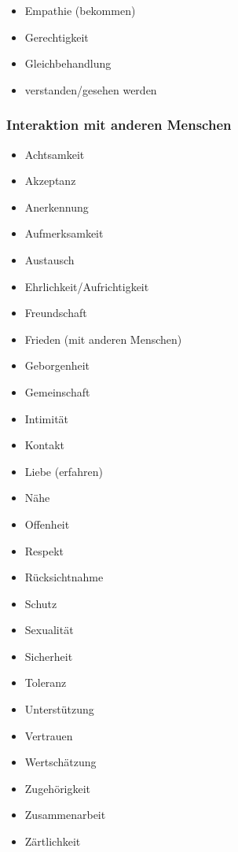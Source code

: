 \begin{multicols}{2}
  \begin{itemize}
    \item Empathie (bekommen)
    \item Gerechtigkeit
    \item Gleichbehandlung
    \item verstanden/gesehen werden
  \end{itemize}
\end{multicols}


\subsubsection{Interaktion mit anderen Menschen}

\begin{multicols}{2}
  \begin{itemize}
    \item Achtsamkeit
    \item Akzeptanz
    \item Anerkennung
    \item Aufmerksamkeit
    \item Austausch
    \item Ehrlichkeit/Aufrichtigkeit
    \item Freundschaft
    \item Frieden (mit anderen Menschen)
    \item Geborgenheit
    \item Gemeinschaft
    \item Intimität
    \item Kontakt
    \item Liebe (erfahren)
    \item Nähe
    \item Offenheit
    \item Respekt
    \item Rücksichtnahme
    \item Schutz
    \item Sexualität
    \item Sicherheit
    \item Toleranz
    \item Unterstützung
    \item Vertrauen
    \item Wertschätzung
    \item Zugehörigkeit
    \item Zusammenarbeit
    \item Zärtlichkeit
  \end{itemize}
\end{multicols}


